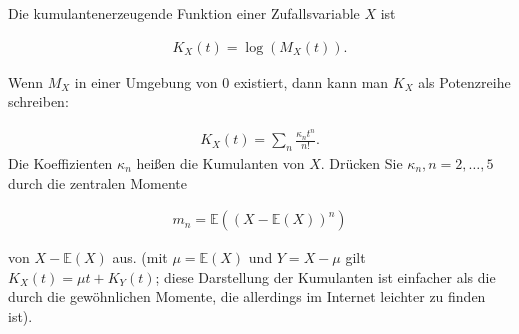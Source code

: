 \begin{exercise}

Die kumulantenerzeugende Funktion einer Zufallsvariable $X$ ist

\begin{align*}
  K_X(t) = \log(M_X(t)).
\end{align*}

Wenn $M_X$ in einer Umgebung von 0 existiert, dann kann man $K_X$ als Potenzreihe schreiben:

\begin{align*}
  K_X(t) = \sum_n\frac{\kappa_nt^n}{n!}.
\end{align*}
Die Koeffizienten $\kappa_n$ heißen die Kumulanten von $X$. Drücken Sie $\kappa_n, n = 2, \ldots, 5$ durch die zentralen Momente

\begin{align*}
  m_n = \mathbb{E}((X-\mathbb{E}(X))^n)
\end{align*}

von $X - \mathbb{E}(X)$ aus. (mit $\mu = \mathbb{E}(X)$ und $Y = X - \mu$ gilt
$K_X(t) = \mu t + K_Y(t)$; diese Darstellung der Kumulanten ist einfacher als die durch die gewöhnlichen Momente, die allerdings im Internet leichter zu finden ist).

\end{exercise}

